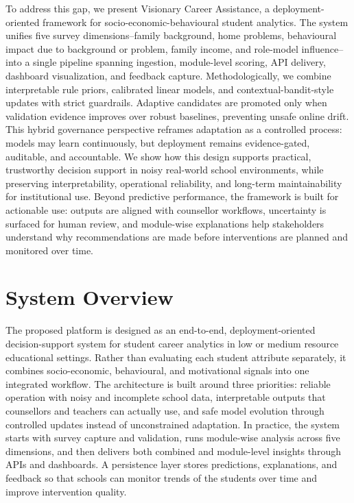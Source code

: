 \documentclass[conference]{IEEEtran}
\begin{document}
To address this gap, we present Visionary Career Assistance, a deployment-oriented framework for socio-economic-behavioural student analytics. The system unifies five survey dimensions--family background, home problems, behavioural impact due to background or problem, family income, and role-model influence--into a single pipeline spanning ingestion, module-level scoring, API delivery, dashboard visualization, and feedback capture. Methodologically, we combine interpretable rule priors, calibrated linear models, and contextual-bandit-style updates with strict guardrails. Adaptive candidates are promoted only when validation evidence improves over robust baselines, preventing unsafe online drift. This hybrid governance perspective reframes adaptation as a controlled process: models may learn continuously, but deployment remains evidence-gated, auditable, and accountable. We show how this design supports practical, trustworthy decision support in noisy real-world school environments, while preserving interpretability, operational reliability, and long-term maintainability for institutional use. Beyond predictive performance, the framework is built for actionable use: outputs are aligned with counsellor workflows, uncertainty is surfaced for human review, and module-wise explanations help stakeholders understand why recommendations are made before interventions are planned and monitored over time.

\section{System Overview}

The proposed platform is designed as an end-to-end, deployment-oriented decision-support system for student career analytics in low or medium resource educational settings. Rather than evaluating each student attribute separately, it combines socio-economic, behavioural, and motivational signals into one integrated workflow. The architecture is built around three priorities: reliable operation with noisy and incomplete school data, interpretable outputs that counsellors and teachers can actually use, and safe model evolution through controlled updates instead of unconstrained adaptation. In practice, the system starts with survey capture and validation, runs module-wise analysis across five dimensions, and then delivers both combined and module-level insights through APIs and dashboards. A persistence layer stores predictions, explanations, and feedback so that schools can monitor trends of the students over time and improve intervention quality.
\end{document}
